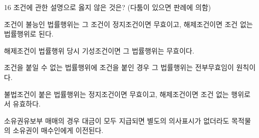 \begin{question}{16}
조건에 관한 설명으로 옳지 않은 것은? (다툼이 있으면 판례에 의함)
\begin{choices}
  \item 조건이 불능인 법률행위는 그 조건이 정지조건이면 무효이고, 해제조건이면 조건 없는 법률행위로 된다.
  \item 해제조건이 법률행위 당시 기성조건이면 그 법률행위는 무효이다.
  \item 조건을 붙일 수 없는 법률행위에 조건을 붙인 경우 그 법률행위는 전부무효임이 원칙이다.
  \item 불법조건이 붙은 법률행위는 정지조건이면 무효이고, 해제조건이면 조건 없는 행위로서 유효하다.
  \item 소유권유보부 매매의 경우 대금이 모두 지급되면 별도의 의사표시가 없더라도 목적물의 소유권이 매수인에게 이전된다.
\end{choices}
\end{question}
